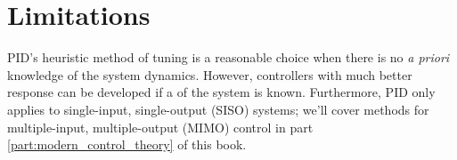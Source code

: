 \section{Limitations}

PID's heuristic method of tuning is a reasonable choice when there is no
\textit{a priori} knowledge of the \gls{system} dynamics. However, controllers
with much better response can be developed if a 
of the \gls{system} is known. Furthermore, PID only applies to single-input,
single-output (SISO) \glspl{system}; we'll cover methods for multiple-input,
multiple-output (MIMO) control in part \ref{part:modern_control_theory} of this
book.
